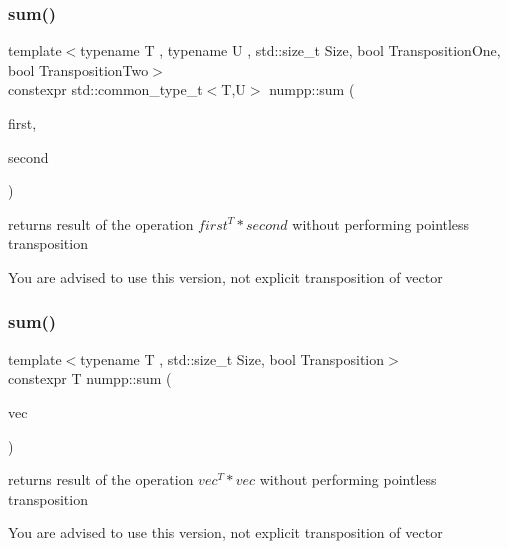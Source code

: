 \subsubsection{\texorpdfstring{sum()}{sum()}\hspace{0.1cm}{\footnotesize\ttfamily [1/2]}}
{\footnotesize\ttfamily template$<$typename T , typename U , std\+::size\+\_\+t Size, bool Transposition\+One, bool Transposition\+Two$>$ \\
constexpr std\+::common\+\_\+type\+\_\+t$<$T,U$>$ numpp\+::sum (\begin{DoxyParamCaption}\item[{const \hyperlink{classnumpp_1_1vector}{vector}$<$ T, Size, Transposition\+One $>$ \&}]{first,  }\item[{const \hyperlink{classnumpp_1_1vector}{vector}$<$ U, Size, Transposition\+Two $>$ \&}]{second }\end{DoxyParamCaption})}

returns result of the operation $first^T * second $ without performing pointless transposition

You are advised to use this version, not explicit transposition of vector\mbox{\label{group__numpp__structures__vector_ga433e83681dca06467aaa4960cb631c79}} 
\subsubsection{\texorpdfstring{sum()}{sum()}\hspace{0.1cm}{\footnotesize\ttfamily [2/2]}}
{\footnotesize\ttfamily template$<$typename T , std\+::size\+\_\+t Size, bool Transposition$>$ \\
constexpr T numpp\+::sum (\begin{DoxyParamCaption}\item[{const \hyperlink{classnumpp_1_1vector}{vector}$<$ T, Size, Transposition $>$ \&}]{vec }\end{DoxyParamCaption})}

returns result of the operation $vec^T * vec$ without performing pointless transposition

You are advised to use this version, not explicit transposition of vector\mbox{\label{group__numpp__structures__vector_ga51b9bb12dcc29ec7b36896742be8438c}} 
